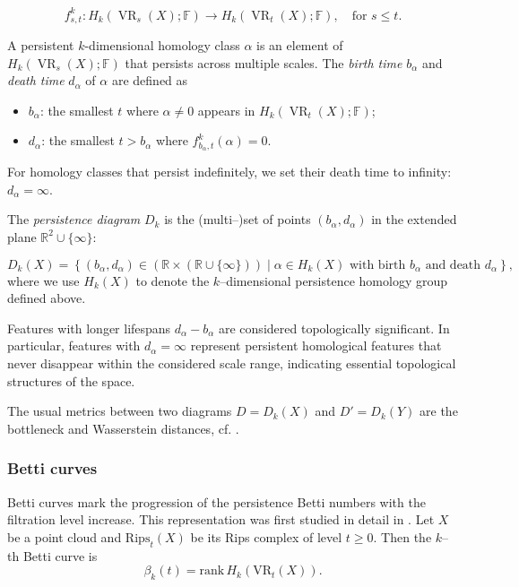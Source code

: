 \documentclass[11pt]{article}
\begin{document}
\[
f_{s,t}^k: H_k\left( \operatorname{VR}_{s}(X); \mathbb{F} \right) \rightarrow H_k\left( \operatorname{VR}_{t}(X); \mathbb{F} \right), \quad \text{for } s \leq t.
\]

A persistent \(k\)-dimensional homology class \(\alpha\) is an element of \(H_k\left( \operatorname{VR}_{s}(X); \mathbb{F} \right)\) that persists across multiple scales. The \textit{birth time} \(b_\alpha\) and \textit{death time} \(d_\alpha\) of \(\alpha\) are defined as

\begin{itemize}
    \item \(b_\alpha\): the smallest \(t\) where \(\alpha \neq 0\) appears in \(H_k\left( \operatorname{VR}_{t}(X); \mathbb{F} \right)\);

    \item \(d_\alpha\): the smallest \(t > b_\alpha\) where \(f_{b_\alpha, t}^k(\alpha) = 0\).
\end{itemize}

For homology classes that persist indefinitely, we set their death time to infinity: \(d_\alpha = \infty\).

The \textit{persistence diagram} \(D_k\) is the (multi--)set of points \((b_\alpha, d_\alpha)\) in the extended plane \(\mathbb{R}^2 \cup \{\infty\}\):

\[
D_k(X) = \left\{ (b_\alpha, d_\alpha) \in (\mathbb{R} \times (\mathbb{R} \cup \{\infty\})) \mid \alpha \in H_k(X) \text{ with birth } b_\alpha \text{ and death } d_\alpha \right\},
\]
where we use $H_k(X)$ to denote the $k$--dimensional persistence homology group defined above. 

Features with longer lifespans \(d_\alpha - b_\alpha\) are considered topologically significant. In particular, features with \(d_\alpha = \infty\) represent persistent homological features that never disappear within the considered scale range, indicating essential topological structures of the space.

The usual metrics between two diagrams $D = D_k(X)$ and $D' = D_k(Y)$ are the bottleneck and Wasserstein distances, cf. \cite{persim-docs}. 

\subsubsection{Betti curves}

Betti curves mark the progression of the persistence Betti numbers with the filtration level increase. This representation was first studied in detail in \cite{Giusti-et-al}. Let $X$ be a point cloud and $\mathrm{Rips}_t(X)$ be its Rips complex of level $t \geq 0$. Then the $k$--th Betti curve is
\[
\beta_k(t) = \mathrm{rank}\, H_k(\mathrm{VR}_t(X)).
\]
\end{document}
